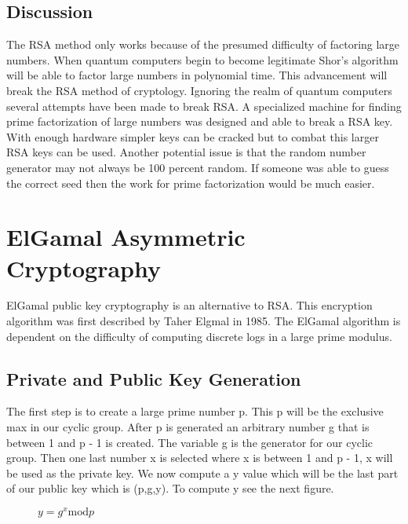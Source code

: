 \documentclass[conference]{IEEEtran}
\begin{document}
\subsection{Discussion}
The RSA method only works because of the presumed difficulty of factoring large numbers. When quantum computers begin to become legitimate Shor's algorithm will be able to factor large numbers in polynomial time. This advancement will break the RSA method of cryptology. \newline
\indent Ignoring the realm of quantum computers several attempts have been made to break RSA. A specialized machine for finding prime factorization of large numbers was designed and able to break a RSA key. With enough hardware simpler keys can be cracked but to combat this larger RSA keys can be used.
\newline \indent
Another potential issue is that the random number generator may not always be 100 percent random. If someone was able to guess the correct seed then the work for prime factorization would be much easier.



\section{ElGamal Asymmetric Cryptography}
ElGamal public key cryptography is an alternative to RSA. This encryption algorithm was first described by Taher Elgmal in 1985. The ElGamal algorithm is dependent on the difficulty of computing discrete logs in a large prime modulus.

\subsection{Private and Public Key Generation}
The first step is to create a large prime number p. This p will be the exclusive max in our cyclic group. After p is generated an arbitrary number g that is between 1 and p - 1 is created. The variable g is the generator for our cyclic group. Then one last number x is selected where x is between 1 and p - 1, x will be used as the private key. We now compute a y value which will be the last part of our public key which is (p,g,y). To compute y see the next figure.

\begin{figure}[h]
	\begin{center}
		$y={g}^{x}\mathrm{mod}p$
	\end{center}
\end{figure}
\end{document}
